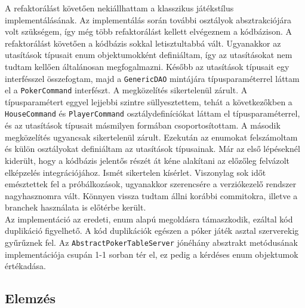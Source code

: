 A refaktorálást követően nekiállhattam a klasszikus játékstílus implementálásának. Az implementálás során további osztályok absztrakciójára volt szükségem, így még több refaktorálást kellett elvégeznem a kódbázison. A refaktorálást követően a kódbázis sokkal letisztultabbá vált. Ugyanakkor az utasítások típusait enum objektumokként definiáltam, így az utasításokat nem tudtam kellően általánosan megfogalmazni. Később az utasítások típusait egy interfésszel összefogtam, majd a \texttt{GenericDAO} mintájára típusparaméterrel láttam el a \texttt{PokerCommand} interfészt. A megközelítés sikertelenül zárult. A típusparamétert eggyel lejjebbi szintre süllyesztettem, tehát a következőkben a \texttt{HouseCommand} és \texttt{PlayerCommand} osztálydefiníciókat láttam el típusparaméterrel, és az utasítások típusait másmilyen formában csoportosítottam. A második megközelítés ugyancsak sikertelenül zárult. Ezekután az enumokat felszámoltam és külön osztályokat definiáltam az utasítások típusainak. Már az első lépéseknél kiderült, hogy a kódbázis jelentős részét át kéne alakítani az előzőleg felvázolt elképzelés integrációjához. Ismét sikertelen kísérlet. Viszonylag sok időt emésztettek fel a próbálkozások, ugyanakkor szerencsére a verziókezelő rendszer nagyhasznomra vált. Könnyen vissza tudtam állni korábbi commitokra, illetve a branchek használata is előtérbe került. \\
Az implementáció az eredeti, enum alapú megoldásra támaszkodik, ezáltal kód duplikáció figyelhető. A kód duplikációk egészen a póker játék asztal szerverekig  gyűrűznek fel. Az \texttt{AbstractPokerTableServer} jónéhány absztrakt metódusának implementációja csupán 1-1 sorban tér el, ez pedig a kérdéses enum objektumok értékadása.

\subsection{Elemzés}

